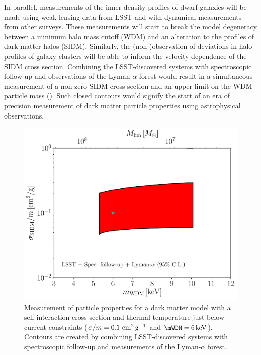 In parallel, measurements of the inner density profiles of dwarf galaxies will be made using weak lensing data from LSST and with dynamical measurements from other surveys.
These measurements will start to break the model degeneracy between a minimum halo mass cutoff (\eg WDM) and an alteration to the profiles of dark matter halos (\eg SIDM).
Similarly, the (non-)observation of deviations in halo profiles of galaxy clusters will be able to inform the velocity dependence of the SIDM cross section.
Combining the LSST-discovered systems with spectroscopic follow-up and observations of the Lyman-$\alpha$ forest would result in a simultaneous measurement of a non-zero SIDM cross section and an upper limit on the WDM particle mass ().
Such closed contours would signify the start of an era of precision measurement of dark matter particle properties using astrophysical observations.

\begin{figure}
\centering
\includegraphics[width=0.6\columnwidth]{figures/SIDM_WDM_fig_disc.pdf}
\caption{\label{fig:sidm_wdm_disc} Measurement of particle properties for a dark matter model with a self-interaction cross section and thermal temperature just below current constraints ($\sigma/m = 0.1 \mathrm{\,\mathrm{\,cm}^2\mathrm{\,g}^{-1}}$ and $\mWDM = 6\keV$). Contours are created by combining LSST-discovered systems with spectroscopic follow-up and measurements of the Lyman-$\alpha$ forest.
 
}
\end{figure}


